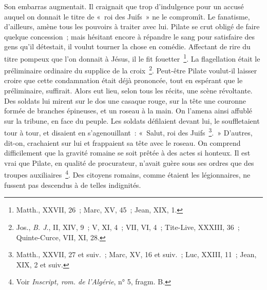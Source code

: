 \documentclass[french,twoside]{book} %
\begin{document}
Son embarras augmentait. Il craignait que trop d’indulgence pour un accusé auquel on donnait le titre de « roi des Juifs » ne le compromît. Le fanatisme, d’ailleurs, amène tous les pouvoirs à traiter avec lui. Pilate se crut obligé de faire quelque concession ; mais hésitant encore à répandre le sang pour satisfaire des gens qu’il détestait, il voulut tourner la chose en comédie. Affectant de rire du titre pompeux que l’on donnait à Jésus, il le fit fouetter \footnote{Matth., XXVII, 26 ; Marc, XV, 45 ; Jean, XIX, 1.}. La flagellation était le préliminaire ordinaire du supplice de la croix \footnote{ Jos., {\itshape B. J}., II, XIV, 9 ; V, XI, 4 ; VII, VI, 4 ; Tite-Live, XXXIII, 36 ; Quinte-Curce, VII, XI, 28.}. Peut-être Pilate voulut-il laisser croire que cette condamnation était déjà prononcée, tout en espérant que le préliminaire, suffirait. Alors eut lieu, selon tous les récits, une scène révoltante. Des soldats lui mirent sur le dos une casaque rouge, sur la tête une couronne formée de branches épineuses, et un roseau à la main. On l’amena ainsi affublé sur la tribune, en face du peuple. Les soldats défilaient devant lui, le souffletaient tour à tour, et disaient en s’agenouillant : « Salut, roi des Juifs \footnote{Matth., XXVII, 27 et suiv. ; Marc, XV, 16 et suiv. ; Luc, XXIII, 11 ; Jean, XIX, 2 et suiv.}. » D’autres, dit-on, crachaient sur lui et frappaient sa tête avec le roseau. On comprend difficilement que la gravité romaine se soit prêtée à des actes si honteux. Il est vrai que Pilate, en qualité de procurateur, n’avait guère sous ses ordres que des troupes auxiliaires \footnote{ Voir {\itshape Inscript, rom. de l’Algérie}, n° 5, fragm. B.}. Des citoyens romains, comme étaient les légionnaires, ne fussent pas descendus à de telles indignités.\par
\end{document}
